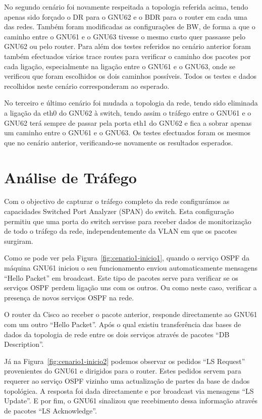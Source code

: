 \documentclass[a4paper,12pt]{article}
\begin{document}
	No segundo cenário foi novamente respeitada a topologia referida acima, tendo apenas sido forçado o DR para o GNU62 e o BDR para o router em cada uma das redes. Também foram modificadas as configurações de BW, de forma a que o caminho entre o GNU61 e o GNU63 tivesse o mesmo custo quer passasse pelo GNU62 ou pelo router. Para além dos testes referidos no cenário anterior foram também efectuados vários trace routes para verificar o caminho dos pacotes por cada ligação, especialmente na ligação entre o GNU61 e o GNU63, onde se verificou que foram escolhidos os dois caminhos possíveis. Todos os testes e dados recolhidos neste cenário corresponderam ao esperado.
				
	No terceiro e último cenário foi mudada a topologia da rede, tendo sido eliminada a ligação da eth0 do GNU62 à switch, tendo assim o tráfego entre o GNU61 e o GNU62 terá sempre de passar pela porta eth1 do GNU62 e fica a sobrar apenas um caminho entre o GNU61 e o GNU63. Os testes efectuados foram os mesmos que no cenário anterior, verificando-se novamente os resultados esperados.

\section{Análise de Tráfego}

	Com o objectivo de capturar o tráfego completo da rede configurámos as capacidades Switched Port Analyzer (SPAN) do switch. Esta configuração permitiu que uma porta do switch servisse para receber dados de monitorização de todo o tráfego da rede, independentemente da VLAN em que os pacotes surgiram.

	Como se pode ver pela Figura~\ref{fig:cenario1-inicio1}, quando o serviço OSPF da máquina GNU61 iniciou o seu funcionamento enviou automaticamente mensagens ``Hello Packet'' em broadcast. Este tipo de pacotes serve para verificar se os serviços OSPF perdem ligação uns com os outros. Ou como neste caso, verificar a presença de novos serviços OSPF na rede. 

	O router da Cisco ao receber o pacote anterior, responde directamente ao GNU61 com um outro ``Hello Packet''. Após o qual existiu transferência das bases de dados da topologia de rede entre os dois serviços através de pacotes ``DB Description''.

	Já na Figura~\ref{fig:cenario1-inicio2} podemos observar os pedidos ``LS Request'' provenientes do GNU61 e dirigidos para o router. Estes pedidos servem para requerer ao serviço OSPF vizinho uma actualização de partes da base de dados topológica. A resposta foi dada directamente e por broadcast via mensagens ``LS Update''. E por fim, o GNU61 sinalizou que recebimento dessa informação através de pacotes ``LS Acknowledge''.
\end{document}

